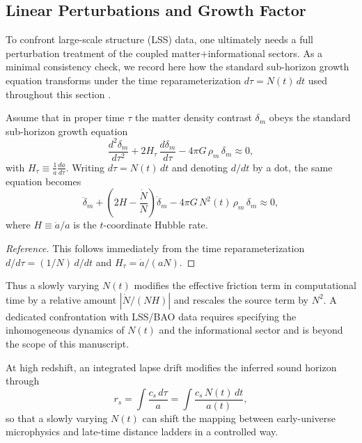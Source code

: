 \subsection{Linear Perturbations and Growth Factor}
To confront large-scale structure (LSS) data, one ultimately needs a full perturbation treatment of the coupled matter+informational sectors. As a minimal consistency check, we record here how the standard sub-horizon growth equation transforms under the time reparameterization $d\tau=N(t)\,dt$ used throughout this section \cite{Dodelson2003}.

\begin{proposition}
\label{prop:growth_lapse_reparam}
Assume that in proper time $\tau$ the matter density contrast $\delta_m$ obeys the standard sub-horizon growth equation \cite{Dodelson2003}
\begin{equation}
    \frac{d^2\delta_m}{d\tau^2}+2H_\tau\,\frac{d\delta_m}{d\tau}-4\pi G\,\rho_m\,\delta_m\approx 0,
\end{equation}
with $H_\tau\equiv \frac{1}{a}\frac{da}{d\tau}$. Writing $d\tau=N(t)\,dt$ and denoting $d/dt$ by a dot, the same equation becomes
\begin{equation}
    \ddot{\delta}_m + \left( 2H - \frac{\dot{N}}{N} \right)\dot{\delta}_m - 4\pi G\,N^2(t)\,\rho_m\,\delta_m \approx 0,
\end{equation}
where $H\equiv \dot a/a$ is the $t$-coordinate Hubble rate.
\end{proposition}
\begin{proof}[Reference]
This follows immediately from the time reparameterization $d/d\tau=(1/N)\,d/dt$ and $H_\tau=\dot a/(aN)$.
\end{proof}
\noindent
Thus a slowly varying $N(t)$ modifies the effective friction term in computational time by a relative amount $|\dot N/(N H)|$ and rescales the source term by $N^2$. A dedicated confrontation with LSS/BAO data requires specifying the inhomogeneous dynamics of $N(t)$ and the informational sector and is beyond the scope of this manuscript.\par
\noindent
At high redshift, an integrated lapse drift modifies the inferred sound horizon through
\begin{equation}
    r_s = \int \frac{c_s\,d\tau}{a}=\int \frac{c_s\,N(t)\,dt}{a(t)},
\end{equation}
so that a slowly varying $N(t)$ can shift the mapping between early-universe microphysics and late-time distance ladders in a controlled way.


